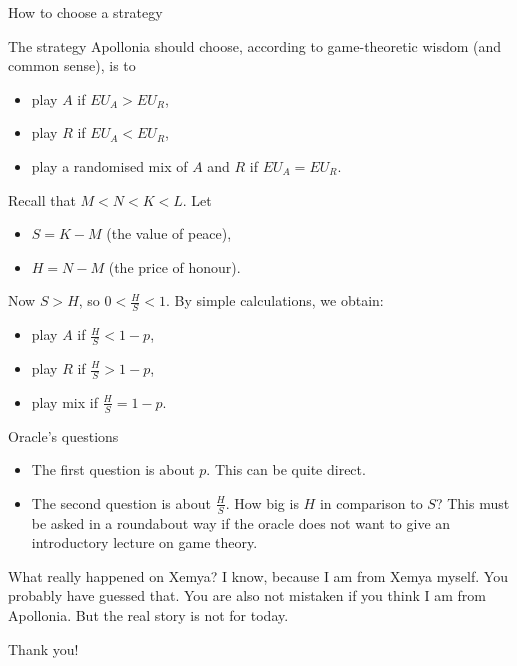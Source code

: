 \documentclass[compress]{beamer}
\begin{document}
\begin{frame}{How to choose a strategy}

The strategy Apollonia should choose, according to game-theoretic wisdom (and
common sense), is to
\begin{itemize}
\item play $A$ if $EU_A > EU_R$,
\item play $R$ if $EU_A < EU_R$,
\item play a randomised mix of $A$ and $R$ if $EU_A = EU_R$.
\end{itemize}

Recall that $M<N<K<L$. Let
\begin{itemize}
\item $S = K-M$ (the value of peace),
\item $H = N-M$ (the price of honour).
\end{itemize}
Now $S>H$, so $0<\frac{H}{S} <1$. By simple calculations, we obtain:
\begin{itemize}
\item play $A$ if $\frac{H}{S} < 1-p$,
\item play $R$ if $\frac{H}{S} > 1-p$,
\item play mix if $\frac{H}{S} = 1-p$.
\end{itemize}

\end{frame}    

\begin{frame}{Oracle's questions}

\begin{itemize}  
\item The first question is about $p$. This can be quite direct.
\item The second question is about $\frac{H}{S}$. How big is $H$ in comparison
  to $S$? This must be 
asked in a roundabout way if the oracle does not want to
give an introductory lecture on game theory. 
\end{itemize}

\begin{block}{What really happened on Xemya?}
\pause
I know, because I am from Xemya myself. You probably have guessed that. You are
also not mistaken if you think I am from Apollonia. But the real story is not
for today. 
\end{block}

\vfill
\pause
{\Huge Thank you!}

\end{frame}  
\end{document}
